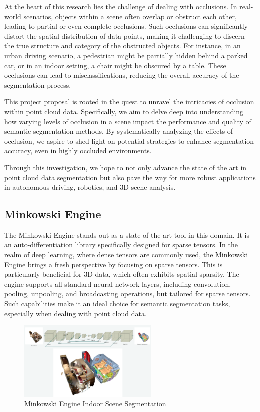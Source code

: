 \documentclass[11pt, a4paper,oneside,chapterprefix=false]{scrbook}
\begin{document}
At the heart of this research lies the challenge of dealing with occlusions. In real-world scenarios, objects within a scene often overlap or obstruct each other, leading to partial or even complete occlusions. Such occlusions can significantly distort the spatial distribution of data points, making it challenging to discern the true structure and category of the obstructed objects. For instance, in an urban driving scenario, a pedestrian might be partially hidden behind a parked car, or in an indoor setting, a chair might be obscured by a table. These occlusions can lead to misclassifications, reducing the overall accuracy of the segmentation process.

This project proposal is rooted in the quest to unravel the intricacies of occlusion within point cloud data. Specifically, we aim to delve deep into understanding how varying levels of occlusion in a scene impact the performance and quality of semantic segmentation methods. By systematically analyzing the effects of occlusion, we aspire to shed light on potential strategies to enhance segmentation accuracy, even in highly occluded environments.

Through this investigation, we hope to not only advance the state of the art in point cloud data segmentation but also pave the way for more robust applications in autonomous driving, robotics, and 3D scene analysis.

\subsection{Minkowski Engine}

The Minkowski Engine stands out as a state-of-the-art tool in this domain. It is an auto-differentiation library specifically designed for sparse tensors. In the realm of deep learning, where dense tensors are commonly used, the Minkowski Engine brings a fresh perspective by focusing on sparse tensors. This is particularly beneficial for 3D data, which often exhibits spatial sparsity. The engine supports all standard neural network layers, including convolution, pooling, unpooling, and broadcasting operations, but tailored for sparse tensors. Such capabilities make it an ideal choice for semantic segmentation tasks, especially when dealing with point cloud data.

\begin{figure}[h]
    \centering
    \includegraphics*[width=0.6\textwidth]{figures/Minkowski Engine.png}
    \caption{Minkowski Engine Indoor Scene Segmentation}
    \label{fig:minkowski}
\end{figure}
\end{document}
